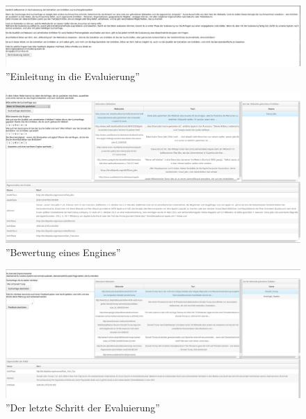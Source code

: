 \begin{figure}
\centering
\includegraphics[width=1.0\textwidth]{Bilder/evalstep1.png}
\caption{''Einleitung in die Evaluierung''}
\label{fig:evalstep01}
\end{figure}

\begin{figure}
\centering
\includegraphics[width=1.0\textwidth]{Bilder/evalstep2.png}
\caption{''Bewertung eines Engines''}
\label{fig:evalstep01}
\end{figure}

\begin{figure}
\centering
\includegraphics[width=1.0\textwidth]{Bilder/evalstep3.png}
\caption{''Der letzte Schritt der Evaluierung''}
\label{fig:evalstep01}
\end{figure}

